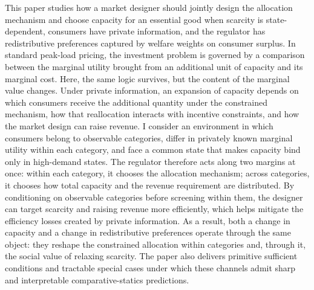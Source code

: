 \documentclass{class}
\begin{document}
This paper studies how a market designer should jointly design the allocation mechanism and choose capacity for an essential good when scarcity is state-dependent, consumers have private information, and the regulator has redistributive preferences captured by welfare weights on consumer surplus. In standard peak-load pricing, the investment problem is governed by a comparison between the marginal utility brought from an additional unit of capacity and its marginal cost. Here, the same logic survives, but the content of the marginal value changes. Under private information, an expansion of capacity depends on which consumers receive the additional quantity under the constrained mechanism, how that reallocation interacts with incentive constraints, and how the market design can raise revenue. I consider an environment in which consumers belong to observable categories, differ in privately known marginal utility within each category, and face a common state that makes capacity bind only in high-demand states. The regulator therefore acts along two margins at once: within each category, it chooses the allocation mechanism; across categories, it chooses how total capacity and the revenue requirement are distributed. By conditioning on observable categories before screening within them, the designer can target scarcity and raising revenue more efficiently, which helps mitigate the efficiency losses created by private information. As a result, both a change in capacity and a change in redistributive preferences operate through the same object: they reshape the constrained allocation within categories and, through it, the social value of relaxing scarcity. The paper also delivers primitive sufficient conditions and tractable special cases under which these channels admit sharp and interpretable comparative-statics predictions.
\end{document}
